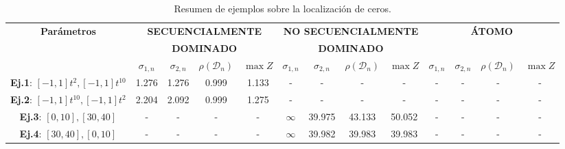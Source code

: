 \begin{table}
	\centering
	\small
	\caption{Resumen de ejemplos sobre la localización de ceros.}
	\begin{tabular}{|c|cccc|cccc|cccc|}
		\hline
		\multirow{3}{*}{\textbf{Parámetros}}       & \multicolumn{4}{c|}{\textbf{SECUENCIALMENTE}} & \multicolumn{4}{c|}{\textbf{NO SECUENCIALMENTE}} & \multicolumn{4}{c|}{\textbf{ÁTOMO}}                                                                                                                                                          \\
		                                           & \multicolumn{4}{c|}{\textbf{DOMINADO}}        & \multicolumn{4}{c|}{\textbf{DOMINADO}}           & \multicolumn{4}{c|}{}                                                                                                                                                                        \\
		\cline{2-13}
		                                           & $\sigma_{1,n}$                                & $\sigma_{2,n}$                                   & $\rho(\mathcal{D}_{n})$             & $\max Z$ & $\sigma_{1,n}$ & $\sigma_{2,n}$ & $\rho(\mathcal{D}_{n})$ & $\max Z$ & $\sigma_{1,n}$ & $\sigma_{2,n}$ & $\rho(\mathcal{D}_{n})$ & $\max Z$ \\
		\hline
		\textbf{Ej.1}: $[-1,1]t^2, [-1,1]t^{10}$   & 1.276                                         & 1.276                                            & 0.999                               & 1.133    & -              & -              & -                       & -        & -              & -              & -                       & -        \\
		\textbf{Ej.2}: $[-1,1]t^{10}, [-1,1]t^{2}$ & 2.204                                         & 2.092                                            & 0.999                               & 1.275    & -              & -              & -                       & -        & -              & -              & -                       & -        \\
		\textbf{Ej.3}: $[0,10], [30,40]$           & -                                             & -                                                & -                                   & -        & $\infty$       & 39.975         & 43.133                  & 50.052   & -              & -              & -                       & -        \\
		\textbf{Ej.4}: $[30,40], [0,10]$           & -                                             & -                                                & -                                   & -        & $\infty$       & 39.982         & 39.983                  & 39.983   & -              & -              & -                       & -        \\

\end{tabular}
\end{table}
